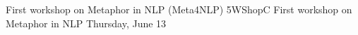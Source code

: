 \begin{wsschedule}
{First workshop on Metaphor in NLP (Meta4NLP)}
{5}{WShopC}
{First workshop on Metaphor in NLP}
{Thursday, June 13}{\WShopLocC}

\end{wsschedule}
